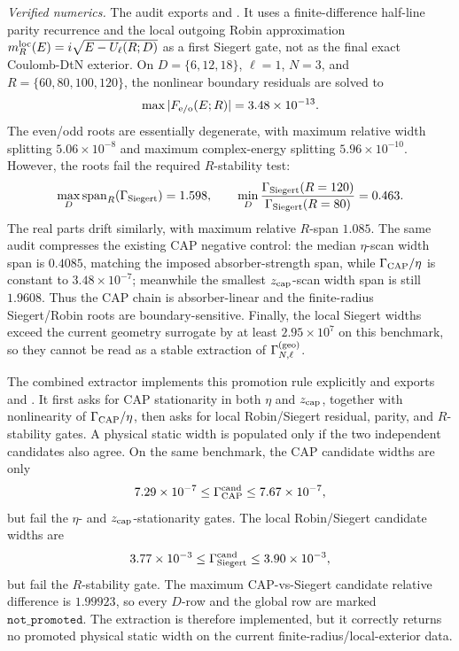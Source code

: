 \documentclass[aps,prd,onecolumn,notitlepage,nofootinbib,superscriptaddress,11pt,floatfix]{revtex4-2}
\begin{document}
\emph{Verified numerics.}
The audit  exports  and .  It uses a finite-difference half-line parity recurrence and the local outgoing Robin approximation \(m_R^{\rm loc}(E)=i\sqrt{E-U_\ell(R;D)}\) as a first Siegert gate, not as the final exact Coulomb-DtN exterior.  On \(D=\{6,12,18\}\), \(\ell=1\), \(N=3\), and \(R=\{60,80,100,120\}\), the nonlinear boundary residuals are solved to
\[
\max |F_{\rm e/o}(E;R)|=3.48\times10^{-13}.
\]
The even/odd roots are essentially degenerate, with maximum relative width splitting \(5.06\times10^{-8}\) and maximum complex-energy splitting \(5.96\times10^{-10}\).  However, the roots fail the required \(R\)-stability test:
\[
\max_D {\rm span}_R(\Gamma_{\rm Siegert})=1.598,\qquad
\min_D \frac{\Gamma_{\rm Siegert}(R=120)}{\Gamma_{\rm Siegert}(R=80)}=0.463.
\]
The real parts drift similarly, with maximum relative \(R\)-span \(1.085\).  The same audit compresses the existing CAP negative control: the median \(\eta\)-scan width span is \(0.4085\), matching the imposed absorber-strength span, while \(\Gamma_{\rm CAP}/\eta\) is constant to \(3.48\times10^{-7}\); meanwhile the smallest \(z_{\rm cap}\)-scan width span is still \(1.9608\).  Thus the CAP chain is absorber-linear and the finite-radius Siegert/Robin roots are boundary-sensitive.  Finally, the local Siegert widths exceed the current geometry surrogate by at least \(2.95\times10^7\) on this benchmark, so they cannot be read as a stable extraction of \(\Gamma_{N,\ell}^{\rm(geo)}\).

The combined extractor  implements this promotion rule explicitly and exports  and .  It first asks for CAP stationarity in both \(\eta\) and \(z_{\rm cap}\), together with nonlinearity of \(\Gamma_{\rm CAP}/\eta\), then asks for local Robin/Siegert residual, parity, and \(R\)-stability gates.  A physical static width is populated only if the two independent candidates also agree.  On the same benchmark, the CAP candidate widths are only
\[
7.29\times10^{-7}\leq \Gamma_{\rm CAP}^{\rm cand}\leq 7.67\times10^{-7},
\]
but fail the \(\eta\)- and \(z_{\rm cap}\)-stationarity gates.  The local Robin/Siegert candidate widths are
\[
3.77\times10^{-3}\leq \Gamma_{\rm Siegert}^{\rm cand}\leq 3.90\times10^{-3},
\]
but fail the \(R\)-stability gate.  The maximum CAP-vs-Siegert candidate relative difference is \(1.99923\), so every \(D\)-row and the global row are marked \(\texttt{not\_promoted}\).  The extraction is therefore implemented, but it correctly returns no promoted physical static width on the current finite-radius/local-exterior data.
\end{document}
